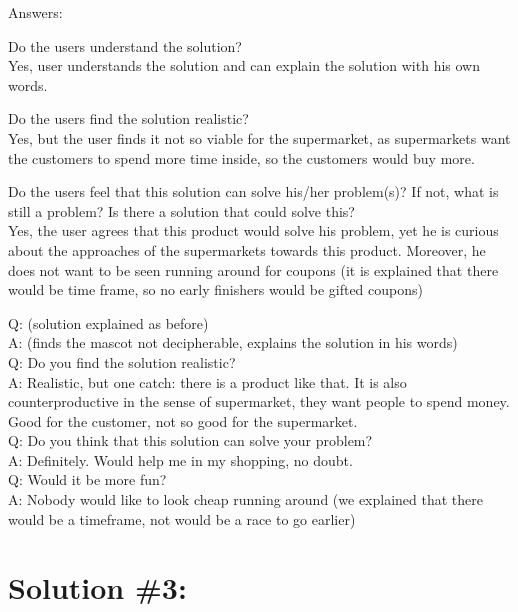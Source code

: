 \documentclass[a4paper,10pt,oneside]{scrreprt}
\begin{document}
Answers:
\begin{compactitem}
	\item Do the users understand the solution?\\
	Yes, user understands the solution and can explain the solution with his own words.
	\\
	
	
	\item Do the users find the solution realistic?\\
	Yes, but the user finds it not so viable for the supermarket, as supermarkets want the customers to spend more time inside, so the customers would buy more.
	\\
	
	\item Do the users feel that this solution can solve his/her problem(s)? If not, what is still
	a problem? Is there a solution that could solve this?\\
	Yes, the user agrees that this product would solve his problem, yet he is curious about the approaches of the supermarkets towards this product. Moreover, he does not want to be seen running around for coupons (it is explained that there would be time frame, so no early finishers would be gifted coupons)
	\\
\end{compactitem}
\bigskip

\noindent Q: (solution explained as before) \\
A: (finds the mascot not decipherable, explains the solution in his words) \\
Q: Do you find the solution realistic?\\
A: Realistic, but one catch: there is a product like that. It is also counterproductive in the sense of supermarket, they want people to spend money. Good for the customer, not so good for the supermarket.\\
Q: Do you think that this solution can solve your problem?\\
A: Definitely. Would help me in my shopping, no doubt.\\
Q: Would it be more fun? \\
A: Nobody would like to look cheap running around (we explained that there would be a timeframe, not would be a race to go earlier)\\



\clearpage
\section{Solution \#3:}
\end{document}
